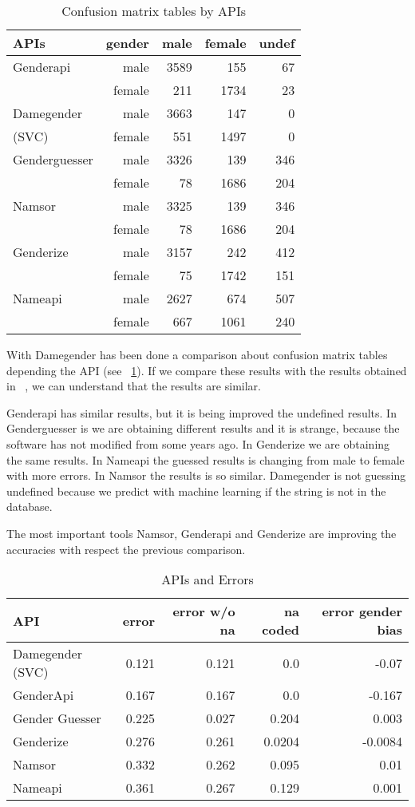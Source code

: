 \documentclass[a4paper]{article}
\begin{document}
\begin{table}
\footnotesize
\begin{tabular}[]{lrrrr}
  \hline
  APIs          & gender & male & female & undef \tabularnewline
\hline
Genderapi         & male    & 3589 & 155  &  67 \tabularnewline
                  & female  & 211  & 1734 &  23 \tabularnewline
Damegender       & male    & 3663 & 147  &   0 \tabularnewline
(SVC)\footnotemark[1] & female  & 551  & 1497 &   0 \tabularnewline
Genderguesser     & male    & 3326 &  139 & 346 \tabularnewline
                  & female  & 78   & 1686 & 204 \tabularnewline
Namsor            & male    & 3325 & 139  & 346 \tabularnewline
                  & female  & 78   & 1686 & 204 \tabularnewline
Genderize         & male    & 3157 & 242  & 412 \tabularnewline
                  & female  & 75   & 1742 & 151 \tabularnewline
Nameapi           & male    & 2627 & 674  & 507 \tabularnewline
                  & female  & 667  & 1061 & 240 \tabularnewline 
\hline
\end{tabular}
\caption{Confusion matrix tables by APIs}
\label{table:ConfusionMatrixTables}
\end{table}

With Damegender has been done a comparison about confusion matrix
tables depending the API (see ~\ref{table:ConfusionMatrixTables}). If
we compare these results with the results obtained in
~\cite{10.7717/peerj-cs.156}, we can understand that the results are
similar.

Genderapi has similar results, but it is being improved the undefined
results. In Genderguesser is we are obtaining different results and it
is strange, because the software has not modified from some years
ago. In Genderize we are obtaining the same results. In Nameapi the
guessed results is changing from male to female with more errors. In
Namsor the results is so similar. Damegender is not guessing undefined
because we predict with machine learning if the string is not in the
database.

The most important tools Namsor, Genderapi and Genderize are improving the
accuracies with respect the previous comparison.

\begin{table*}
\footnotesize
\begin{tabular}[]{lrrrr}
\hline
API & error & error w/o na & na coded & error gender bias\tabularnewline
\hline
Damegender (SVC)\footnotemark[1] & 0.121 & 0.121 & 0.0 & -0.07\tabularnewline
GenderApi & 0.167 & 0.167 & 0.0 & -0.167\tabularnewline
Gender Guesser & 0.225 & 0.027 & 0.204 & 0.003\tabularnewline
Genderize & 0.276 & 0.261 & 0.0204 & -0.0084 \tabularnewline 
Namsor & 0.332 & 0.262 & 0.095 & 0.01 \tabularnewline
Nameapi & 0.361 & 0.267 & 0.129 & 0.001 \tabularnewline
\hline
\end{tabular}
\caption{APIs and Errors}
\label{table:ApisAndErrors}
\end{table*}
\end{document}
